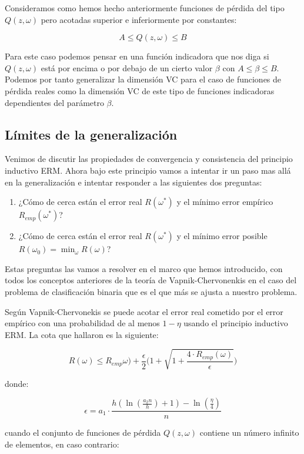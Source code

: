 Consideramos como hemos hecho anteriormente funciones de pérdida del tipo $Q(z,\omega)$ pero acotadas superior e inferiormente por constantes:

$$A\leq Q(z,\omega) \leq B$$

Para este caso podemos pensar en una función indicadora que nos diga si $Q(z,\omega)$ está por encima o por debajo de un cierto valor $\beta$ con $A\leq \beta \leq B$. Podemos por tanto generalizar la dimensión VC para el caso de funciones de pérdida reales como la dimensión VC de este tipo de funciones indicadoras dependientes del parámetro $\beta$.

\subsection{Límites de la generalización}

Venimos de discutir las propiedades de convergencia y consistencia del principio inductivo ERM. Ahora bajo este principio vamos a intentar ir un paso mas allá en la generalización e intentar responder a las siguientes dos preguntas:

\begin{enumerate}
	\item ¿Cómo de cerca están el error real $R(\omega^*)$ y el mínimo error empírico $R_{emp}(\omega^*)$?
	\item ¿Cómo de cerca están el error real $R(\omega^*)$ y el mínimo error posible $R(\omega_0) = \min_{\omega} R(\omega)$?
\end{enumerate}

Estas preguntas las vamos a resolver en el marco que hemos introducido, con todos los conceptos anteriores de la teoría de Vapnik-Chervonenkis en el caso del problema de clasificación binaria que es el que más se ajusta a nuestro problema.

Según Vapnik-Chervonekis se puede acotar el error real cometido por el error empírico con una probabilidad de al menos $1-\eta$ usando el principio inductivo ERM. La cota que hallaron es la siguiente:

$$R(\omega) \leq R_{emp} \omega) + \frac{\epsilon}{2} \biggl( 1+\sqrt{1+\frac{4\cdot R_{emp}(\omega)}{\epsilon}} \biggl)$$

donde:

$$\epsilon = a_1 \cdot \frac{h(\ln (\frac{a_2 n}{h})+1) - \ln (\frac{\eta}{4})}{n}$$

cuando el conjunto de funciones de pérdida $Q(z, \omega)$ contiene un número infinito de elementos, en caso contrario:

